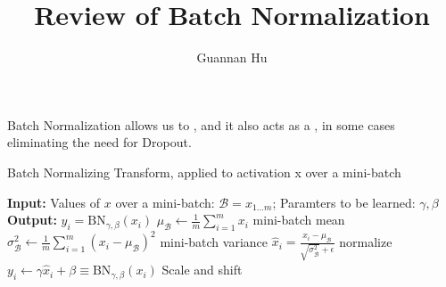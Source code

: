 \documentclass[12pt,a4paper]{article}
\begin{document}
\title{Review of Batch Normalization}
\author{Guannan Hu}
\maketitle

\paragraph{} Batch Normalization allows us to {\color{red}{use much higher learning rates and be less careful about initialization}}, and it also acts as a {\color{red}{regularizer}}, in some cases eliminating the need for Dropout.

\begin{algorithm}
\caption{Batch Normalizing Transform, applied to activation x over a mini-batch}
\label{agl.1}
\begin{algorithmic}
\State \textbf{Input:} Values of $x$ over a mini-batch: $\mathcal{B}={x_{1...m}}$; Paramters to be learned: $\gamma, \beta$
\State \textbf{Output:} ${y_i=\text{BN}_{\gamma, \beta}(x_i)}$
\State \qquad$\mu_{\mathcal{B}} \leftarrow \frac{1}{m}\sum\limits_{i=1}^{m}x_i$ \Comment mini-batch mean
\State \qquad$\sigma_{\mathcal{B}}^{2} \leftarrow \frac{1}{m}\sum\limits_{i=1}^{m}(x_i - \mu_{\mathcal{B}})^{2}$ \Comment mini-batch variance
\State \qquad$\hat{x}_i = \frac{x_i - \mu_{\mathcal{B}}}{\sqrt{\sigma_{\mathcal{B}}^{2}} + \epsilon}$ \Comment normalize
\State \qquad$y_i \leftarrow \gamma\hat{x}_i + \beta \equiv \text{BN}_{\gamma, \beta}(x_i)$ \Comment Scale and shift
\end{algorithmic}
\end{algorithm}
\end{document}
